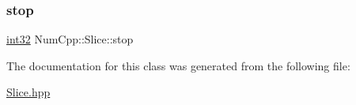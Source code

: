 \mbox{\label{class_num_cpp_1_1_slice_a443abc110225a97be15c02b1b89c10f3}} 
\subsubsection{\texorpdfstring{stop}{stop}}
{\footnotesize\ttfamily \mbox{\hyperlink{namespace_num_cpp_acf3eb1592f8b248ff0a236634864633c}{int32}} Num\+Cpp\+::\+Slice\+::stop}



The documentation for this class was generated from the following file\+:\begin{DoxyCompactItemize}
\item 
\mbox{\hyperlink{_slice_8hpp}{Slice.\+hpp}}\end{DoxyCompactItemize}
